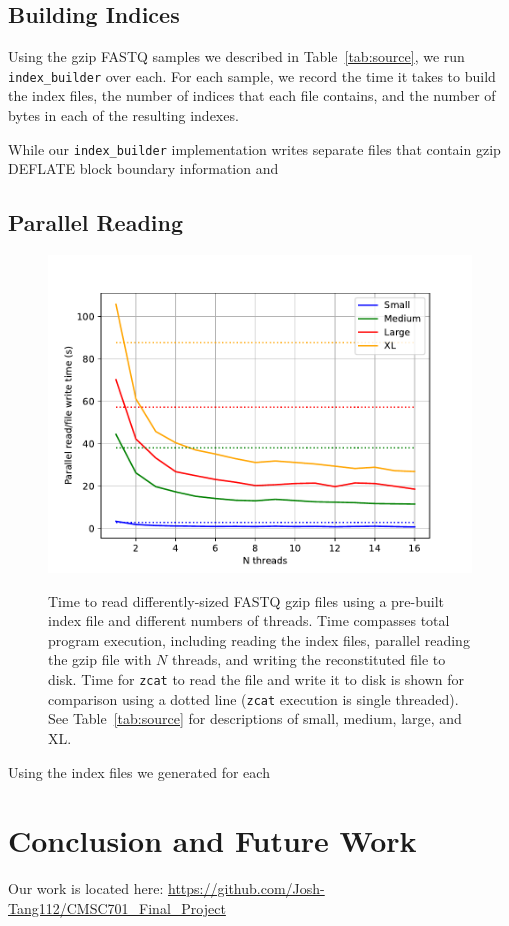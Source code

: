 \documentclass[unnumsec,webpdf,contemporary,large]{oup-authoring-template}
\newcommand{\ibuilder}{\texttt{index\_builder}\xspace}
\newcommand{\gzip}{gzip\xspace}
\begin{document}
\subsection{Building Indices}
\label{sec:buildresults}


Using the \gzip FASTQ samples we described in Table~\ref{tab:source}, we run
\ibuilder over each. For each sample, we record the time it takes to build the
index files, the number of indices that each file contains, and the number of
bytes in each of the resulting indexes. 

While our \ibuilder implementation
writes separate files that contain \gzip DEFLATE block boundary information and



\subsection{Parallel Reading}
\label{sec:readresults}

\begin{figure}[h]
    \includegraphics[width=\linewidth]{figs/cores.pdf}
    \label{fig:cores}
    \caption{Time to read differently-sized FASTQ \gzip files using a pre-built
    index file and different numbers of threads. Time compasses total program
    execution, including reading the index files, parallel reading the \gzip
    file with $N$ threads, and writing the reconstituted file to disk. Time for
    \texttt{zcat} to read the file and write it to disk is shown for comparison
    using a dotted line (\texttt{zcat} execution is single threaded). See
    Table~\ref{tab:source} for descriptions of small, medium, large, and XL.}
\end{figure}

Using the index files we generated for each 


\section{Conclusion and Future Work}

Our work is located here:
\url{https://github.com/Josh-Tang112/CMSC701_Final_Project}



\end{document}
